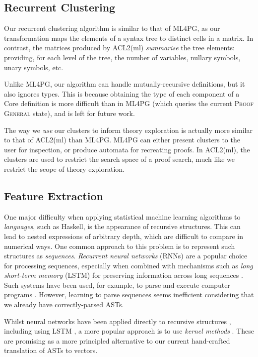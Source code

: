 \subsection{Recurrent Clustering}
\label{sec:clusteringexpressions}

Our recurrent clustering algorithm is similar to that of ML4PG, as our transformation maps the elements of a syntax tree to distinct cells in a matrix. In contrast, the matrices produced by ACL2(ml) \emph{summarise} the tree elements: providing, for each level of the tree, the number of variables, nullary symbols, unary symbols, etc.

Unlike ML4PG, our algorithm can handle mutually-recursive definitions, but it also ignores types. This is because obtaining the type of each component of a Core definition is more difficult than in ML4PG (which queries the current \textsc{Proof General} state), and is left for future work.

The way we \emph{use} our clusters to inform theory exploration is actually more similar to that of ACL2(ml) than ML4PG. ML4PG can either present clusters to the user for inspection, or produce automata for recreating proofs. In ACL2(ml), the clusters are used to restrict the search space of a proof search, much like we restrict the scope of theory exploration.

\subsection{Feature Extraction}

One major difficulty when applying statistical machine learning algorithms to \emph{languages}, such as Haskell, is the appearance of recursive structures. This can lead to nested expressions of arbitrary depth, which are difficult to compare in numerical ways. One common approach to this problem is to represent such structures as \emph{sequences}. \emph{Recurrent neural networks} (RNNs) are a popular choice for processing sequences, especially when combined with mechanisms such as \emph{long short-term memory} (LSTM) for preserving information across long sequences \cite{hochreiter1997long}. Such systems have been used, for example, to parse and execute computer programs \cite{zaremba2014learning}. However, learning to parse sequences seems inefficient considering that we already have correctly-parsed ASTs.

Whilst neural networks have been applied directly to recursive structures \cite{goller1996learning}, including using LSTM \cite{zhu2015long}, a more popular approach is to use \emph{kernel methods} \cite{bakir2007predicting}. These are promising as a more principled alternative to our current hand-crafted translation of ASTs to vectors.
